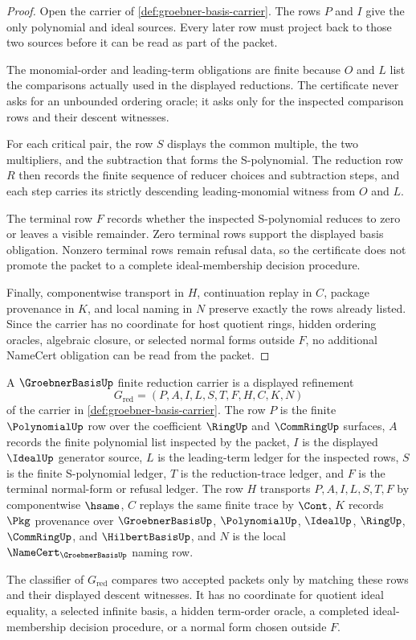 \begin{proof}
Open the carrier of \autoref{def:groebner-basis-carrier}. The rows $P$ and $I$ give the only polynomial and ideal sources. Every later row must project back to those two sources before it can be read as part of the packet.

The monomial-order and leading-term obligations are finite because $O$ and $L$ list the comparisons actually used in the displayed reductions. The certificate never asks for an unbounded ordering oracle; it asks only for the inspected comparison rows and their descent witnesses.

For each critical pair, the row $S$ displays the common multiple, the two multipliers, and the subtraction that forms the S-polynomial. The reduction row $R$ then records the finite sequence of reducer choices and subtraction steps, and each step carries its strictly descending leading-monomial witness from $O$ and $L$.

The terminal row $F$ records whether the inspected S-polynomial reduces to zero or leaves a visible remainder. Zero terminal rows support the displayed basis obligation. Nonzero terminal rows remain refusal data, so the certificate does not promote the packet to a complete ideal-membership decision procedure.

Finally, componentwise transport in $H$, continuation replay in $C$, package provenance in $K$, and local naming in $N$ preserve exactly the rows already listed. Since the carrier has no coordinate for host quotient rings, hidden ordering oracles, algebraic closure, or selected normal forms outside $F$, no additional NameCert obligation can be read from the packet.
\end{proof}

\begin{definition}
\label{def:groebner-basis-finite-reduction-carrier}
A $\GroebnerBasisUp$ finite reduction carrier is a displayed refinement
$$
G_{\mathrm{red}}=(P,A,I,L,S,T,F,H,C,K,N)
$$
of the carrier in \autoref{def:groebner-basis-carrier}. The row $P$ is the finite $\PolynomialUp$ row over the coefficient $\RingUp$ and $\CommRingUp$ surfaces, $A$ records the finite polynomial list inspected by the packet, $I$ is the displayed $\IdealUp$ generator source, $L$ is the leading-term ledger for the inspected rows, $S$ is the finite S-polynomial ledger, $T$ is the reduction-trace ledger, and $F$ is the terminal normal-form or refusal ledger. The row $H$ transports $P,A,I,L,S,T,F$ by componentwise $\hsame$, $C$ replays the same finite trace by $\Cont$, $K$ records $\Pkg$ provenance over $\GroebnerBasisUp$, $\PolynomialUp$, $\IdealUp$, $\RingUp$, $\CommRingUp$, and $\HilbertBasisUp$, and $N$ is the local $\NameCert_{\GroebnerBasisUp}$ naming row.

The classifier of $G_{\mathrm{red}}$ compares two accepted packets only by matching these rows and their displayed descent witnesses. It has no coordinate for quotient ideal equality, a selected infinite basis, a hidden term-order oracle, a completed ideal-membership decision procedure, or a normal form chosen outside $F$.
\end{definition}

